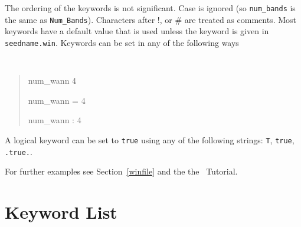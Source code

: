 The ordering of the keywords is not significant. Case is ignored (so
\verb#num_bands# is the same as \verb#Num_Bands#). Characters after !, or \#
are treated as comments. Most keywords have a default value that is
used unless the keyword is given in {\tt seedname.win}. Keywords can be set
in any of the following ways
{\tt
\begin{quote}
num\_wann   4

num\_wann = 4

num\_wann : 4
\end{quote} }
A logical keyword can be set to {\tt true} using any of the following
strings: {\tt T}, {\tt true}, {\tt .true.}.

For further examples see Section~\ref{winfile} and the the \wannier\ Tutorial.

\section{Keyword List}
\label{parameter_data}

